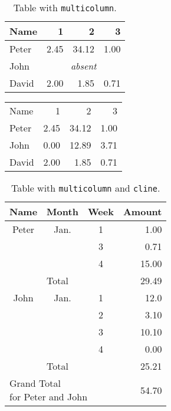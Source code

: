 \documentclass{amsart}
\begin{document}
\begin{table}[h]
    \begin{center}
        \begin{tabular}{|l|r|r|r|}\hline
            Name &1 &2 &3\\\hline
            Peter &2.45 &34.12 &1.00\\\hline
            John &\multicolumn{3}{c|}{\emph{absent}}\\\hline
            David &2.00 &1.85 &0.71\\\hline
        \end{tabular}
        \caption{Table with \texttt{multicolumn}.}
    \end{center}
\end{table}

\begin{table}[h]
    \begin{center}
        \begin{tabular}{p{1in}|r|r|r}
            \hline
            Name &1 &2 &3\\\cline{2-3}
            Peter &2.45 &34.12 &1.00\\\hline
            John &0.00 &12.89 &3.71\\\hline
            David &2.00 &1.85 &0.71\\\hline
        \end{tabular}
    \end{center}
\end{table}

\begin{table}[h]
    \begin{center}
        \begin{tabular}{|c c|c|r|}
            \hline
            Name &Month &Week &Amount\\\hline
            Peter &Jan. &1 &1.00\\\cline{3-4}
            & &3 &0.71\\\cline{3-4}
            & &4 &15.00\\\cline{2-4}
            &\multicolumn{2}{|l}{Total} &29.49\\\hline
            John &Jan. &1 &12.0\\\cline{3-4}
            & &2 &3.10\\\cline{3-4}
            & &3 &10.10\\\cline{3-4}
            & &4 &0.00\\\cline{2-4}
            &\multicolumn{2}{|l}{Total} &25.21\\\hline
            \multicolumn{3}{|l}{\parbox[b]{10em}{\strut Grand Total\\for Peter and John}} &54.70\\\hline
        \end{tabular}
        \caption{Table with \texttt{multicolumn}
        and \texttt{cline}.}
    \end{center}
\end{table}
\end{document}
